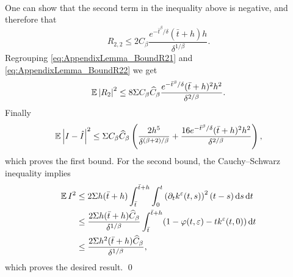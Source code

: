 \documentclass[10pt]{article}
\begin{document}
\begin{appendices}
\begin{equation}
\begin{aligned}
\end{aligned}
\end{equation}
One can show that the second term in the inequality above is negative, and therefore that
\begin{equation}\label{eq:AppendixLemma_BoundR22}
	R_{2,2} \leq  2 C_\beta \frac{e^{-\bar t^\beta / \delta} (\bar t + h)h}{\delta^{1/\beta}}.
\end{equation}
Regrouping \eqref{eq:AppendixLemma_BoundR21} and \eqref{eq:AppendixLemma_BoundR22} we get
\begin{equation}
	\operatorname{\mathbb{E}}\left\lvert R_2\right\rvert^2 \leq 8 \Sigma C_\beta \widehat C_\beta \frac{e^{-\bar t^\beta / \delta} (\bar t + h)^2h^2}{\delta^{2/\beta}}.
\end{equation} 
Finally
\begin{equation}
	\operatorname{\mathbb{E}}\left\lvert I-\hat I\right\rvert^2 \leq \Sigma C_\beta \widehat C_\beta \left( \frac{2h^5}{\delta^{(\beta+2)/\beta}} +  \frac{16e^{-\bar t^\beta / \delta} (\bar t + h)^2h^2}{\delta^{2/\beta}} \right),
\end{equation}
which proves the first bound. For the second bound, the Cauchy--Schwarz inequality implies
\begin{equation}
\begin{aligned}
	\operatorname{\mathbb{E}} I^2 &\leq 2\Sigma h(\bar t + h) \int_{\bar t}^{\bar t + h} \int_0^t \left(\partial_t k^\varepsilon(t,s)\right)^2 (t - s) \,\mathrm{d} s \,\mathrm{d} t\\
	&\leq \frac{2\Sigma h(\bar t + h) \widehat C_\beta}{\delta^{1/\beta}} \int_{\bar t}^{\bar t + h} (1 - \varphi(t, \varepsilon) - tk^\varepsilon(t, 0) )\,\mathrm{d} t\\
	&\leq \frac{2\Sigma h^2(\bar t + h) \widehat C_\beta}{\delta^{1/\beta}},
\end{aligned}
\end{equation}
which proves the desired result.
\qed

\end{appendices}




\end{document}
